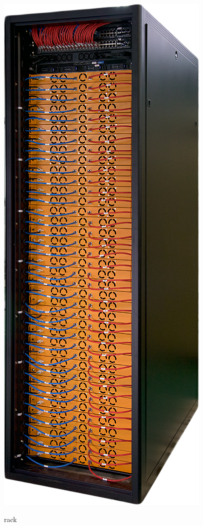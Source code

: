 \begin{figure}[htbp]
\centering
\includegraphics[scale=0.40]{img/rack.png}\\
\caption{rack \label{figura1.12} \cite{etichetta9}}
\end{figure}

